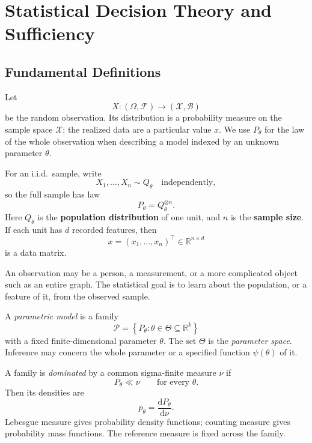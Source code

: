 \section{Statistical Decision Theory and Sufficiency}

\subsection{Fundamental Definitions}

\begin{definition}
    Let
\[
X:(\Omega,\mathcal{F})\longrightarrow(\mathcal{X},\mathcal{B})
\]
be the random observation. Its distribution is a probability measure on
the sample space $\mathcal{X}$; the realized data are a particular value
$x$. We use $P_\theta$ for the law of the whole observation when
describing a model indexed by an unknown parameter $\theta$.

For an i.i.d.\ sample, write
\[
X_1,\ldots,X_n\sim Q_\theta
\quad\text{independently},
\]
so the full sample has law
\[
P_\theta=Q_\theta^{\otimes n}.
\]
Here $Q_\theta$ is the \textbf{population distribution} of one unit, and
$n$ is the \textbf{sample size}. If each unit has $d$ recorded features,
then
\[
x=(x_1,\ldots,x_n)^\top\in\mathbb{R}^{n\times d}
\]
is a data matrix.

An observation may be a person, a measurement, or a more complicated
object such as an entire graph. The statistical goal is to learn about
the population, or a feature of it, from the observed sample.
\end{definition}

\begin{definition}
A \emph{parametric model} is a family
\[
\mathcal{P}
=
\left\{
P_\theta:\theta\in\Theta\subseteq\mathbb{R}^k
\right\}
\]
with a fixed finite-dimensional parameter $\theta$. The set $\Theta$ is
the \emph{parameter space}. Inference may concern the whole parameter or
a specified function $\psi(\theta)$ of it.
\end{definition}

\begin{definition}
A family is \emph{dominated} by a common sigma-finite measure $\nu$ if
\[
P_\theta\ll\nu
\qquad\text{for every }\theta.
\]
Then its densities are
\[
p_\theta=\frac{\mathrm{d}P_\theta}{\mathrm{d}\nu}.
\]
Lebesgue measure gives probability density functions; counting measure
gives probability mass functions. The reference measure is fixed across
the family.
\end{definition}

